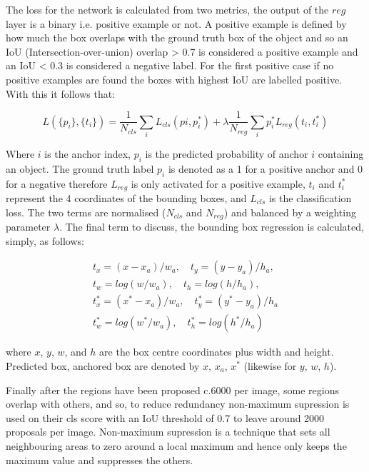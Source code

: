 \documentclass[a4paper,11pt,notitlepage]{article}
\begin{document}
The loss for the network is calculated from two metrics, the output of the $reg$ layer is a binary i.e. positive example or not. A positive example is defined by how much the box overlaps with the ground truth box of the object and so an IoU (Intersection-over-union) overlap > 0.7 is considered a positive example and an IoU < 0.3 is considered a negative label. For the first positive case if no positive examples are found the boxes with highest IoU  are labelled positive. With this it follows that:

\begin{equation}
\label{multi-task_loss}
L(\{p_{i}\},\{t_{i}\}) = \frac{1}{N_{cls}} \sum_{i} L_{cls}(p{i},p_{i}^{*}) + \lambda \frac{1}{N_{reg}} \sum_{i}p_{i}^{*} L_{reg}(t_{i},t_{i}^{*})
\end{equation}

Where $i$ is the anchor index, $p_{i}$ is the predicted probability of anchor $i$ containing an object. The ground truth label $p_{i}$ is denoted as a 1 for a positive anchor and 0 for a negative therefore $L_{reg}$ is only activated for a positive example, $t_{i}$ and $t_{i}^{*}$ represent the 4 coordinates of the bounding boxes, and $L_{cls}$ is the classification loss. The two terms are normalised ($N_{cls}$ and $N_{reg}$) and balanced by a weighting parameter $\lambda$. The final term to discuss, the bounding box regression is calculated, simply, as follows:

\begin{equation}
\begin{aligned}
\label{multi-task_loss}
t_{x} = (x-x_{a})/w_{a}, \quad t_{y} = (y-y_{a})/h_{a},\\
t_{w} = log(w/w_{a}), \quad t_{h} = log(h/h_{a}), \\
t_{x}^{*} = (x^{*}-x_{a})/w_{a},\quad t_{y}^{*} = (y^{*} - y_{a})/h_{a} \\
t_{w}^{*} = log(w^{*}/w_{a}), \quad t_{h}^{*} = log(h^{*}/h_{a})
\end{aligned}
\end{equation}

where $x$, $y$, $w$, and $h$ are the box centre coordinates plus width and height. Predicted box, anchored box are denoted by $x$, $x_{a}$, $x^{*}$ (likewise for $y$, $w$, $h$).

Finally after the regions have been proposed c.6000 per image, some regions overlap with others, and so, to reduce redundancy non-maximum supression is used on their cls score with an IoU threshold of 0.7 to leave around 2000 proposals per image. Non-maximum supression is a technique that sets all neighbouring areas to zero around a local maximum and hence only keeps the maximum value and suppresses the others.
 
\end{document}
